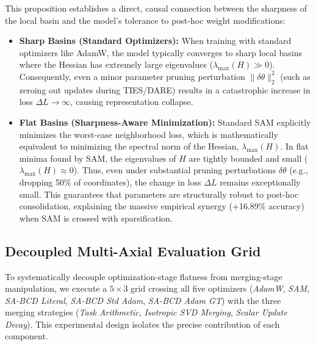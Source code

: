 This proposition establishes a direct, causal connection between the sharpness of the local basin and the model's tolerance to post-hoc weight modifications:
\begin{itemize}
  \item \textbf{Sharp Basins (Standard Optimizers):} When training with standard optimizers like AdamW, the model typically converges to sharp local basins where the Hessian has extremely large eigenvalues ($\lambda_{\max}(H) \gg 0$). Consequently, even a minor parameter pruning perturbation $\|\delta\theta\|_2^2$ (such as zeroing out updates during TIES/DARE) results in a catastrophic increase in loss $\Delta L \to \infty$, causing representation collapse.
  \item \textbf{Flat Basins (Sharpness-Aware Minimization):} Standard SAM explicitly minimizes the worst-case neighborhood loss, which is mathematically equivalent to minimizing the spectral norm of the Hessian, $\lambda_{\max}(H)$. In flat minima found by SAM, the eigenvalues of $H$ are tightly bounded and small ($\lambda_{\max}(H) \approx 0$). Thus, even under substantial pruning perturbations $\delta\theta$ (e.g., dropping 50\% of coordinates), the change in loss $\Delta L$ remains exceptionally small. This guarantees that parameters are structurally robust to post-hoc consolidation, explaining the massive empirical synergy (+16.89\% accuracy) when SAM is crossed with sparsification.
\end{itemize}

\subsection{Decoupled Multi-Axial Evaluation Grid}
To systematically decouple optimization-stage flatness from merging-stage manipulation, we execute a $5 \times 3$ grid crossing all five optimizers (\emph{AdamW}, \emph{SAM}, \emph{SA-BCD Literal}, \emph{SA-BCD Std Adam}, \emph{SA-BCD Adam GT}) with the three merging strategies (\emph{Task Arithmetic}, \emph{Isotropic SVD Merging}, \emph{Scalar Update Decay}). This experimental design isolates the precise contribution of each component.
